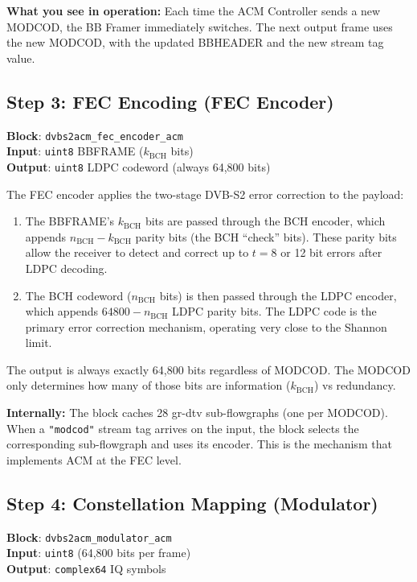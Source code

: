 \documentclass[12pt,a4paper]{report}
\begin{document}
\textbf{What you see in operation:} Each time the ACM Controller sends a new
MODCOD, the BB Framer immediately switches. The next output frame uses the new
MODCOD, with the updated BBHEADER and the new stream tag value.

\subsection{Step 3: FEC Encoding (FEC Encoder)}

\textbf{Block}: \texttt{dvbs2acm\_fec\_encoder\_acm} \\
\textbf{Input}: \texttt{uint8} BBFRAME ($k_\text{BCH}$ bits) \\
\textbf{Output}: \texttt{uint8} LDPC codeword (always 64,800 bits)

The FEC encoder applies the two-stage DVB-S2 error correction to the payload:

\begin{enumerate}
    \item The BBFRAME's $k_\text{BCH}$ bits are passed through the BCH encoder,
          which appends $n_\text{BCH} - k_\text{BCH}$ parity bits (the BCH
          ``check'' bits). These parity bits allow the receiver to detect and
          correct up to $t = 8$ or 12 bit errors after LDPC decoding.
    \item The BCH codeword ($n_\text{BCH}$ bits) is then passed through the
          LDPC encoder, which appends $64800 - n_\text{BCH}$ LDPC parity bits.
          The LDPC code is the primary error correction mechanism, operating
          very close to the Shannon limit.
\end{enumerate}

The output is always exactly 64,800 bits regardless of MODCOD. The MODCOD only
determines how many of those bits are information ($k_\text{BCH}$) vs redundancy.

\textbf{Internally:} The block caches 28 gr-dtv sub-flowgraphs (one per MODCOD).
When a \texttt{"modcod"} stream tag arrives on the input, the block selects the
corresponding sub-flowgraph and uses its encoder. This is the mechanism that
implements ACM at the FEC level.

\subsection{Step 4: Constellation Mapping (Modulator)}

\textbf{Block}: \texttt{dvbs2acm\_modulator\_acm} \\
\textbf{Input}: \texttt{uint8} (64,800 bits per frame) \\
\textbf{Output}: \texttt{complex64} IQ symbols
\end{document}
